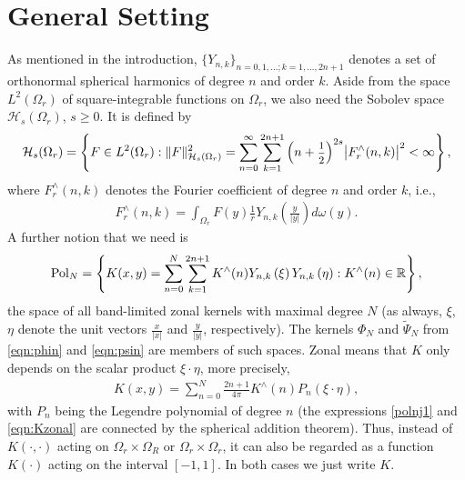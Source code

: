 \documentclass[a4paper, 10pt]{article}
\numberwithin{equation}{section}
\theoremstyle{definition}
\begin{document}
\section{General Setting}\label{sec:sett}%

As mentioned in the introduction, $\{Y_{n,k}\}_{n=0,1,\ldots;k=1,\ldots,2n+1}$ denotes a set of orthonormal spherical harmonics of degree $n$ and order $k$. Aside from the space  $L^2(\Omega_r)$ of square-integrable functions on $\Omega_r$, we also need the Sobolev space $\mathcal{H}_s(\Omega_r)$, $s\geq 0$. It is defined by
\begin{align}\label{eqn:sobspace}
\mathcal{H}_s(\Omega_r)=\left\{F\in L^2(\Omega_r):\|F\|_{\mathcal{H}_s(\Omega_r)}^2=\sum_{n=0}^\infty\sum_{k=1}^{2n+1}\Big(n+\textnormal{\footnotesize $\frac{1}{2}$}\Big)^{2s} \big|F_r^\wedge(n,k)\big|^2<\infty\right\},
\end{align}
where $F_r^\wedge(n,k)$ denotes the Fourier coefficient of degree $n$ and order $k$, i.e.,
\begin{align}
F_r^\wedge(n,k)=\int_{\Omega_r}F(y)\frac{1}{r}Y_{n,k}\left(\frac{y}{|y|}\right)d\omega(y).
\end{align}
A further notion that we need is 
\begin{align}\label{polnj1}
\textnormal{Pol}_{N}=\left\{K(x,y)=\sum_{n=0}^{N}\sum_{k=1}^{2n+1}K^\wedge(n) Y_{n,k}\left(\xi\right)Y_{n,k}\left(\eta\right):K^\wedge(n)\in\mathbb{R}\right\},
\end{align}
the space of all band-limited zonal kernels with maximal degree $N$ (as always, $\xi$, $\eta$ denote the unit vectors $\frac{x}{|x|}$ and $\frac{y}{|y|}$, respectively). The kernels $\Phi_N$ and $\tilde{\Psi}_N$ from \eqref{eqn:phin} and \eqref{eqn:psin} are members of such spaces. Zonal means that $K$ only depends on the scalar product $\xi\cdot\eta$, more precisely,
\begin{align}\label{eqn:Kzonal}
K(x,y)=\sum_{n=0}^{N}\frac{2n+1}{4\pi}K^\wedge(n) P_n\left(\xi\cdot\eta\right),
\end{align}
with $P_n$ being the Legendre polynomial of degree $n$ (the expressions \eqref{polnj1} and \eqref{eqn:Kzonal} are connected by the spherical addition theorem). Thus, instead of $K(\cdot,\cdot)$ acting on $\Omega_r\times\Omega_R$ or $\Omega_r\times\Omega_r$, it can also be regarded as a function $K(\cdot)$ acting on the interval $[-1,1]$. In both cases we just write $K$. 
\end{document}
